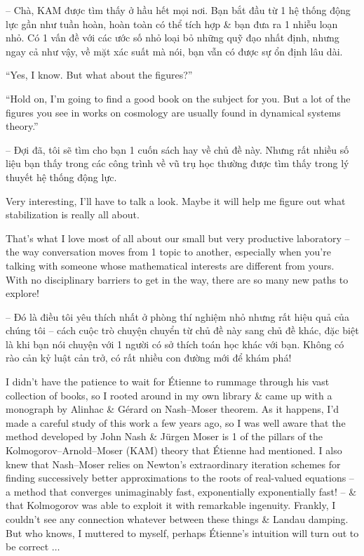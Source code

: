 \documentclass{article}
\begin{document}
\begin{enumerate}
	-- Chà, KAM được tìm thấy ở hầu hết mọi nơi. Bạn bắt đầu từ 1 hệ thống động lực gần như tuần hoàn, hoàn toàn có thể tích hợp \& bạn đưa ra 1 nhiễu loạn nhỏ. Có 1 vấn đề với các ước số nhỏ loại bỏ những quỹ đạo nhất định, nhưng ngay cả như vậy, về mặt xác suất mà nói, bạn vẫn có được sự ổn định lâu dài.

	``Yes, I know. But what about the figures?''

	``Hold on, I'm going to find a good book on the subject for you. But a lot of the figures you see in works on cosmology are usually found in dynamical systems theory.''

	-- Đợi đã, tôi sẽ tìm cho bạn 1 cuốn sách hay về chủ đề này. Nhưng rất nhiều số liệu bạn thấy trong các công trình về vũ trụ học thường được tìm thấy trong lý thuyết hệ thống động lực.

	Very interesting, I'll have to talk a look. Maybe it will help me figure out what stabilization is really all about.

	That's what I love most of all about our small but very productive laboratory -- the way conversation moves from 1 topic to another, especially when you're talking with someone whose mathematical interests are different from yours. With no disciplinary barriers to get in the way, there are so many new paths to explore!

	-- Đó là điều tôi yêu thích nhất ở phòng thí nghiệm nhỏ nhưng rất hiệu quả của chúng tôi -- cách cuộc trò chuyện chuyển từ chủ đề này sang chủ đề khác, đặc biệt là khi bạn nói chuyện với 1 người có sở thích toán học khác với bạn. Không có rào cản kỷ luật cản trở, có rất nhiều con đường mới để khám phá!

	I didn't have the patience to wait for \'Etienne to rummage through his vast collection of books, so I rooted around in my own library \& came up with a monograph by {\sc Alinhac \& G\'erard} on Nash--Moser theorem. As it happens, I'd made a careful study of this work a few years ago, so I was well aware that the method developed by {\sc John Nash \& J\"urgen Moser} is 1 of the pillars of the Kolmogorov--Arnold--Moser (KAM) theory that \'Etienne had mentioned. I also knew that Nash--Moser relies on Newton's extraordinary iteration schemes for finding successively better approximations to the roots of real-valued equations -- a method that converges unimaginably fast, exponentially exponentially fast! -- \& that {\sc Kolmogorov} was able to exploit it with remarkable ingenuity. Frankly, I couldn't see any connection whatever between these things \& Landau damping. But who knows, I muttered to myself, perhaps {\sc\'Etienne}'s intuition will turn out to be correct $\ldots$


\end{enumerate}
\end{document}
